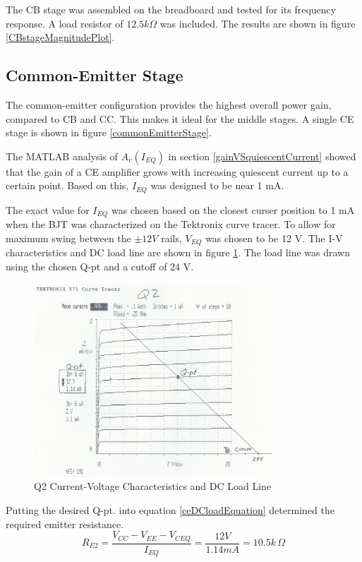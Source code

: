 \documentclass[titlepage, letterpaper, 11pt]{article}
\begin{document}
The CB stage was assembled on the breadboard and tested for its
frequency response. A load resistor of $12.5k\Omega$ was included.
The results are shown in figure \ref{CBstageMagnitudePlot}.

\subsection{Common-Emitter Stage}

The common-emitter configuration provides the highest overall power
gain, compared to CB and CC. This makes it ideal for the middle
stages. A single CE stage is shown in figure 
\ref{commonEmitterStage}.

The MATLAB analysis of $A_{v}(I_{EQ})$ in section
\ref{gainVSquiescentCurrent} showed that the gain of a CE amplifier
grows with increasing quiescent current up to a certain point. Based
on this, $I_{EQ}$ was designed to be near 1 mA.

The exact value for $I_{EQ}$ was chosen based on the closest curser
position to 1 mA when the BJT was characterized on the Tektronix
curve tracer. To allow for maximum swing between the $\pm12V$ rails,
$V_{EQ}$ was chosen to be 12 V. The I-V characteristics and DC load
line are shown in figure \ref{q2Characteristics}. The load line was
drawn using the chosen Q-pt and a cutoff of 24 V.

\begin{figure}[ht]
	\centering
	\includegraphics[width=0.8\textwidth]
		{measurements/q2Characteristics}
	\caption{
		Q2 Current-Voltage Characteristics and DC Load Line
	}
	\label{q2Characteristics}
\end{figure}

Putting the desired Q-pt. into equation \ref{ceDCloadEquation}
determined the required emitter resistance.
\begin{equation*}
R_{E2}=\frac{V_{CC}-V_{EE}-V_{CEQ}}{I_{EQ}}=\frac{12V}{1.14mA}
=10.5k\,\Omega
\end{equation*}
\end{document}
